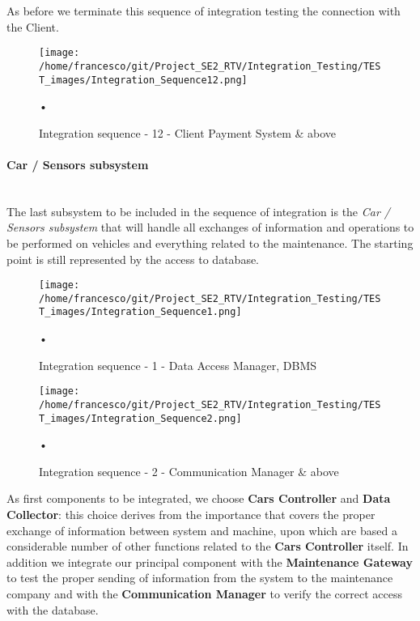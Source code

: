 \documentclass[10pt, a4paper,titlepage]{article}
\begin{document}
As before we terminate this sequence of integration testing the connection with the Client.
\begin{figure}[h]
\begin{center}
\texttt{[image: /home/francesco/git/Project\_SE2\_RTV/Integration\_Testing/TEST\_images/Integration\_Sequence12.png]}
\caption{Integration sequence - 12 - Client Payment System \& above}
\label{fig:int_seq12}
\end{center}•
\end{figure}
\clearpage
\paragraph{Car / Sensors subsystem}\mbox{}\\
The last subsystem to be included in the sequence of integration is the \emph{Car / Sensors subsystem} that will handle all exchanges of information and operations to be performed on vehicles and everything related to the maintenance.
The starting point is still represented by the access to database.
\begin{figure}[h]
\begin{center}
\texttt{[image: /home/francesco/git/Project\_SE2\_RTV/Integration\_Testing/TEST\_images/Integration\_Sequence1.png]}
\caption{Integration sequence - 1 - Data Access Manager, DBMS}
\label{fig:int_seq1_3}
\end{center}•
\end{figure}
\begin{figure}[h]
\begin{center}
\texttt{[image: /home/francesco/git/Project\_SE2\_RTV/Integration\_Testing/TEST\_images/Integration\_Sequence2.png]}
\caption{Integration sequence - 2 - Communication Manager \& above}
\label{fig:int_seq2_3}
\end{center}•
\end{figure}
\clearpage
As first components to be integrated, we choose \textbf{Cars Controller} and \textbf{Data Collector}: this choice derives from the importance that covers the proper exchange of information between system and machine, upon which are based a considerable number of other functions related to the \textbf{Cars Controller} itself. In addition we integrate our principal component with the \textbf{Maintenance Gateway}  to test the proper sending of information from the system to the maintenance company and with the \textbf{Communication Manager} to verify the correct access with the database.
\end{document}
